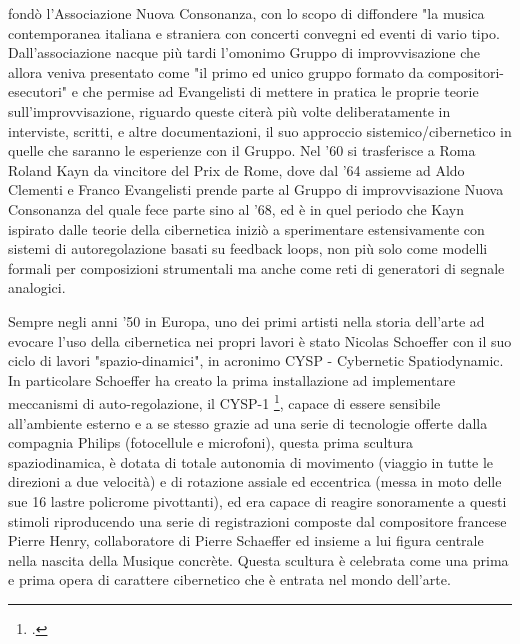 fondò l'Associazione Nuova Consonanza, con lo scopo di diffondere "la musica contemporanea italiana e straniera con concerti convegni ed eventi di vario tipo. 
Dall'associazione nacque più tardi l'omonimo Gruppo di improvvisazione 
che allora veniva presentato come "il primo ed unico gruppo formato da compositori-esecutori" 
e che permise ad Evangelisti di mettere in pratica le proprie teorie sull'improvvisazione,
riguardo queste citerà più volte deliberatamente in interviste, scritti,
e altre documentazioni, il suo approccio sistemico/cibernetico 
in quelle che saranno le esperienze con il Gruppo.
Nel '60 si trasferisce a Roma Roland Kayn da vincitore del Prix de Rome, 
dove dal '64 assieme ad Aldo Clementi e Franco Evangelisti
prende parte al Gruppo di improvvisazione Nuova Consonanza
del quale fece parte sino al '68,
ed è in quel periodo che Kayn ispirato dalle teorie della cibernetica iniziò a sperimentare
estensivamente con sistemi di autoregolazione basati su feedback loops,
non più solo come modelli formali per composizioni strumentali 
ma anche come reti di generatori di segnale analogici.

Sempre negli anni '50 in Europa, uno dei primi artisti nella storia dell'arte 
ad evocare l'uso della cibernetica nei propri lavori è stato
Nicolas Schoeffer con il suo ciclo di lavori "spazio-dinamici", in acronimo
CYSP - Cybernetic Spatiodynamic. 
In particolare Schoeffer ha creato la prima installazione ad implementare meccanismi
di auto-regolazione, il CYSP-1 \footcite{SanfilippoValle},
capace di essere sensibile all'ambiente esterno e a se stesso
grazie ad una serie di tecnologie offerte dalla compagnia Philips (fotocellule e microfoni),
questa prima scultura spaziodinamica, è dotata di totale autonomia di movimento 
(viaggio in tutte le direzioni a due velocità) e di rotazione assiale ed eccentrica 
(messa in moto delle sue 16 lastre policrome pivottanti),
ed era capace di reagire sonoramente a questi stimoli riproducendo
una serie di registrazioni composte dal compositore francese Pierre Henry,
collaboratore di Pierre Schaeffer ed insieme a lui figura centrale nella nascita della Musique concrète.
Questa scultura è celebrata come una prima e prima opera di carattere cibernetico che è entrata nel mondo dell'arte. 

